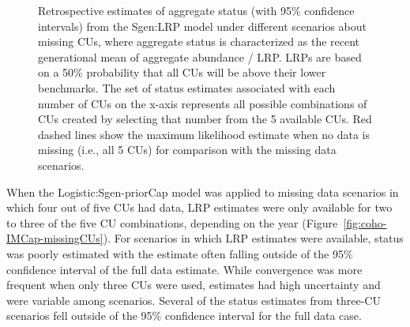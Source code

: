 \documentclass[11pt]{book}
\begin{document}
\begin{figure}[htb]

{\centering {} 

}

\caption{Retrospective estimates of aggregate status (with 95\% confidence intervals) from the Sgen:LRP  model under different scenarios about missing CUs, where aggregate status is characterized as the recent generational mean of aggregate abundance / LRP. LRPs are based on a 50\% probability that all CUs will be above their lower benchmarks. The set of status estimates associated with each number of CUs on the x-axis represents all possible combinations of CUs created by selecting that number from the 5 available CUs.  Red dashed lines show the maximum likelihood estimate when no data is missing (i.e., all 5 CUs) for comparison with the missing data scenarios.}\label{fig:coho-IM-missingCUs}
\end{figure}
\linebreak

When the Logistic:Sgen-priorCap model was applied to missing data scenarios in which four out of five CUs had data, LRP estimates were only available for two to three of the five CU combinations, depending on the year (Figure~\ref{fig:coho-IMCap-missingCUs}). For scenarios in which LRP estimates were available, status was poorly estimated with the estimate often falling outside of the 95\% confidence interval of the full data estimate. While convergence was more frequent when only three CUs were used, estimates had high uncertainty and were variable among scenarios. Several of the status estimates from three-CU scenarios fell outside of the 95\% confidence interval for the full data case.
\end{document}
